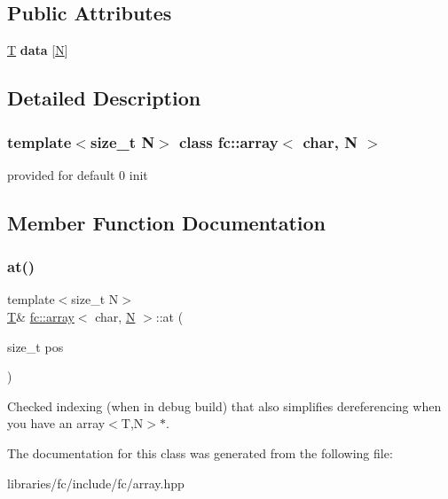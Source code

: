 \subsection*{Public Attributes}
\begin{DoxyCompactItemize}
\item 
\mbox{\label{classfc_1_1array_3_01char_00_01_n_01_4_a704c4c96db9d9c3e0bd4e6ffcb1241d5}} 
\mbox{\hyperlink{struct_t}{T}} {\bfseries data} \mbox{[}\mbox{\hyperlink{group__types_gaf9c1edb0e0da55ec6ba09f32f6839529}{N}}\mbox{]}
\end{DoxyCompactItemize}


\subsection{Detailed Description}
\subsubsection*{template$<$size\+\_\+t N$>$\newline
class fc\+::array$<$ char, N $>$}

provided for default 0 init 

\subsection{Member Function Documentation}
\mbox{\label{classfc_1_1array_3_01char_00_01_n_01_4_a7ce0269b643af65d33b386e6fdf86ddb}} 
\subsubsection{\texorpdfstring{at()}{at()}}
{\footnotesize\ttfamily template$<$size\+\_\+t N$>$ \\
\mbox{\hyperlink{struct_t}{T}}\& \mbox{\hyperlink{classfc_1_1array}{fc\+::array}}$<$ char, \mbox{\hyperlink{group__types_gaf9c1edb0e0da55ec6ba09f32f6839529}{N}} $>$\+::at (\begin{DoxyParamCaption}\item[{size\+\_\+t}]{pos }\end{DoxyParamCaption})\hspace{0.3cm}{\ttfamily [inline]}}

Checked indexing (when in debug build) that also simplifies dereferencing when you have an array$<$\+T,\+N$>$$\ast$. 

The documentation for this class was generated from the following file\+:\begin{DoxyCompactItemize}
\item 
libraries/fc/include/fc/array.\+hpp\end{DoxyCompactItemize}
